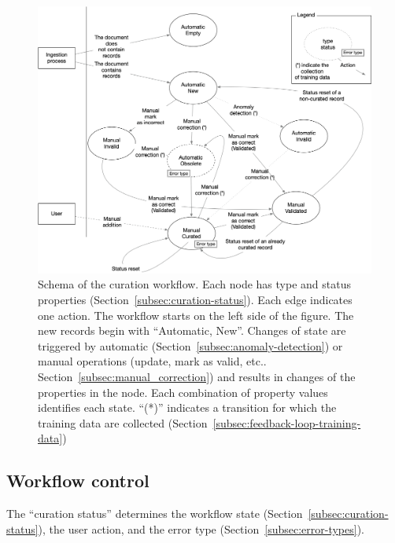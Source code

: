 \begin{figure}[htbp]
  \centering
  \includegraphics[width=1\textwidth]{figures/curation/record-correction} 
  \caption{Schema of the curation workflow. Each node has type and status properties (Section~\ref{subsec:curation-status}). Each edge indicates one action. The workflow starts on the left side of the figure. The new records begin with ``Automatic, New''. Changes of state are triggered by automatic (Section~\ref{subsec:anomaly-detection}) or manual operations (update, mark as valid, etc.. Section~\ref{subsec:manual_correction}) and results in changes of the properties in the node. Each combination of property values identifies each state. ``(*)'' indicates a transition for which the training data are collected (Section~\ref{subsec:feedback-loop-training-data})}
  \label{fig:curation-workflow}
\end{figure}


\subsection{Workflow control}
\label{subsec:workflow-control}
The ``curation status'' determines the workflow state (Section~\ref{subsec:curation-status}), the user action, and the error type (Section~\ref{subsec:error-types}).

